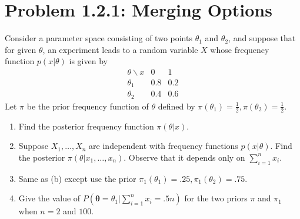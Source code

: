 \documentclass{amsbook}
\theoremstyle{definition}
\theoremstyle{remark}
\numberwithin{section}{chapter}
\numberwithin{equation}{chapter}
\begin{document}
\section{Problem 1.2.1: Merging Options}
Consider a parameter space consisting of two points $\theta_1$ and $\theta_2$, and suppose that for given $\theta$, an experiment leads to a random variable $X$ whose frequency function $p(x|\theta)$ is given by\[
\begin{array}{c|c|c}
\theta\backslash x&0&1\\\hline
\theta_1&0.8&0.2\\\hline
\theta_2&0.4&0.6
\end{array}
\]Let $\pi$ be the prior frequency function of $\theta$ defined by $\pi(\theta_1)=\frac{1}{2},\pi(\theta_2)=\frac{1}{2}$.
\begin{enumerate}[label=(\alph*)]
\item Find the posterior frequency function $\pi(\theta|x)$.
\item Suppose $X_1,\dots,X_n$ are independent with frequency functions $p(x|\theta)$. Find the posterior $\pi(\theta|x_1,\dots,x_n)$. Observe that it depends only on $\sum_{i=1}^nx_i$.
\item Same as (b) except use the prior $\pi_1(\theta_1)=.25,\pi_1(\theta_2)=.75$.
\item Give the value of $P(\bm{\theta}=\theta_1|\sum_{i=1}^nx_i=.5n)$ for the two priors $\pi$ and $\pi_1$ when $n=2$ and $100$.
\end{enumerate}
\end{document}
